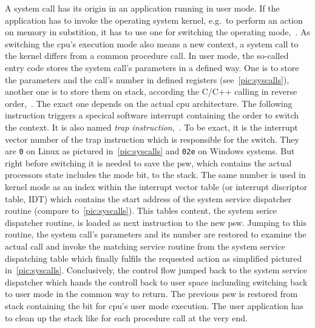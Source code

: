A system call has its origin in an application running in user mode.
If the application has to invoke the operating system kernel, e.g.\ to perform an action on memory in substition, it has to use one for switching the operating mode\cite{glatz2015betriebssysteme},~\cite{tanenbaum-modern-operating-systems}.
As switching the \ac{cpu}'s execution mode also means a new context, a system call to the kernel differs from a common procedure call.
In user mode, the so-called entry code stores the system call's parameters in a defined way.
One is to store the parameters and the call's number in defined registers (see~\ref{pic:syscalls}), another one is to store them on stack, according the C/C++ calling in reverse order\cite{silberschatz2009operating},~\cite{glatz2015betriebssysteme}.
The exact one depends on the actual \ac{cpu} architecture.
The following instruction triggers a specical software interrupt containing the order to switch the context.
It is also named \textit{trap instruction}\cite{glatz2015betriebssysteme},~\cite{tanenbaum-modern-operating-systems}.
To be exact, it is the interrupt vector number of the trap instruction which is responsible for the switch.
They are \texttt{0} on Linux as pictured in~\ref{pic:syscalls} and \texttt{0\x2e} on Windows systems\cite{glatz2015betriebssysteme}.
But right before switching it is needed to save the \acf{psw}, which contains the actual processors state includes the mode bit, to the stack.
The same number is used in kernel mode as an index within the interrupt vector table (or interrupt discriptor table, IDT) which contains the start address of the system service dispatcher routine (compare to~\ref{pic:syscalls}).
This tables content, the system serice dispatcher routine, is loaded as next instruction to the new \ac{psw}\cite{brause2017betriebssysteme}.
Jumping to this routine, the system call's parameters and its number are restored to examine the actual call and invoke the matching service routine from the system service dispatching table which finally fulfils the requested action as simplified pictured in~\ref{pic:syscalls}\cite{glatz2015betriebssysteme}.
Conclusively, the control flow jumped back to the system service dispatcher which hands the controll back to user space inclunding switching back to user mode in the common way to return\cite{glatz2015betriebssysteme}.
The previous \ac{psw} is restored from stack containing the bit for \ac{cpu}'s user mode execution.
The user application has to clean up the stack like for each procedure call at the very end\cite{tanenbaum-modern-operating-systems}.

